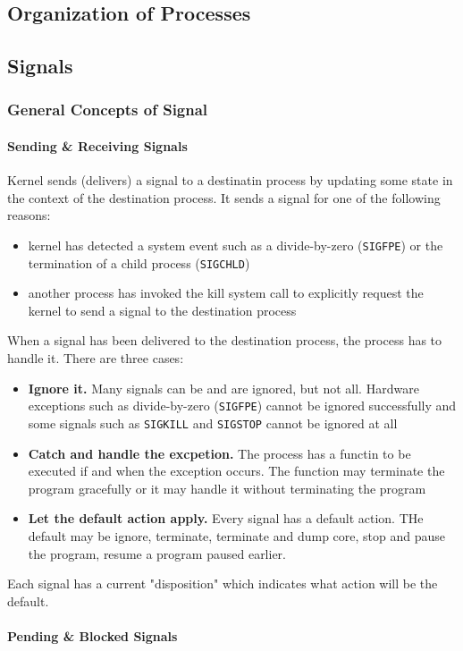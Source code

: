 \documentclass{article}
\newcommand{\bold}[1]{\textbf{#1}}
\renewcommand{\b}{\item[$\circ$]}
\newcommand{\newlist}{\begin{itemize}}
\renewcommand{\endlist}{\end{itemize}}
\newcommand{\code}[1]{\texttt{#1}}
\begin{document}
\subsection{Organization of Processes}

\subsection{Signals}

\subsubsection{General Concepts of Signal}

\paragraph{Sending \& Receiving Signals}

Kernel sends (delivers) a signal to a destinatin process by updating some state in the context of the destination process. It sends a signal for one of the following reasons:

\newlist
\b kernel has detected a system event such as a divide-by-zero (\code{SIGFPE}) or the termination of a child process (\code{SIGCHLD})
\b another process has invoked the kill system call to explicitly request the kernel to send a signal to the destination process
\endlist

\noindent When a signal has been delivered to the destination process, the process has to handle it. There are three cases:

\newlist 
\b \bold{Ignore it.} Many signals can be and are ignored, but not all. Hardware exceptions such as divide-by-zero (\code{SIGFPE}) cannot be ignored successfully and some signals such as \code{SIGKILL} and \code{SIGSTOP} cannot be ignored at all
\b \bold{Catch and handle the excpetion.} The process has a functin to be executed if and when the exception occurs. The function may terminate the program gracefully or it may handle it without terminating the program
\b \bold{Let the default action apply.} Every signal has a default action. THe default may be ignore, terminate, terminate and dump core, stop and pause the program, resume a program paused earlier.
\endlist

\noindent Each signal has a current "disposition" which indicates what action will be the default.

\paragraph{Pending \& Blocked Signals}
\end{document}
